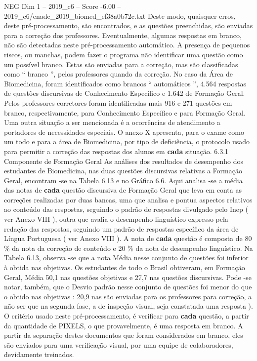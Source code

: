 \begin{textsample}{NEG Dim 1 – 2019\_c6 – Score -6.00 – 2019\_c6/enade\_2019\_biomed\_ef38a0b72c.txt}
Deste modo, quaisquer erros, deste pré-processamento, são encontrados, e as questões preenchidas, são enviadas para a correção dos professores.
Eventualmente, algumas respostas em branco, não são detectadas neste pré-processamento automático.
A presença de pequenos riscos, ou manchas, podem fazer o programa não identificar uma questão como um possível branco.
Estas são enviadas para a correção, mas são classificadas como “ branco ”, pelos professores quando da correção.
No caso da Área de Biomedicina, foram identificados como brancos “ automáticos ”, 4.564 respostas de questões discursivas de Conhecimento Específico e 1.642 de Formação Geral.
Pelos professores corretores foram identificadas mais 916 e 271 questões em branco, respectivamente, para Conhecimento Específico e para Formação Geral.
Uma outra situação a ser mencionada é a ocorrências de atendimento a portadores de necessidades especiais.
O anexo X apresenta, para o exame como um todo e para a área de Biomedicina, por tipo de deficiência, o protocolo usado para permitir a correção das respostas dos alunos em \textbf{cada} situação. 6.3.1 Componente de Formação Geral As análises dos resultados de desempenho dos estudantes de Biomedicina, nas duas questões discursivas relativas a Formação Geral, encontram -se na Tabela 6.13 e no Gráfico 6.6.
Aqui analisa -se a média das notas de \textbf{cada} questão discursiva de Formação Geral que leva em conta as correções realizadas por duas bancas, uma que analisa e pontua aspectos relativos ao conteúdo das respostas, seguindo o padrão de respostas divulgado pelo Inep ( ver Anexo VIII ), outra que avalia o desempenho linguístico expresso pela redação das respostas, seguindo um padrão de respostas específico da área de Língua Portuguesa ( ver Anexo VIII ).
A nota de \textbf{cada} questão é composta de 80 \% da nota da correção de conteúdo e 20 \% da nota de desempenho linguístico.
Na Tabela 6.13, observa -se que a nota Média nesse conjunto de questões foi inferior à obtida nas objetivas.
Os estudantes de todo o Brasil obtiveram, em Formação Geral, Média 50,1 nas questões objetivas e 27,7 nas questões discursivas.
Pode -se notar, também, que o Desvio padrão nesse conjunto de questões foi menor do que o obtido nas objetivas : 20,9 nas são enviadas para os professores para correção, a não ser que na segunda fase, a de inspeção visual, seja constatada uma resposta ).
O critério usado neste pré-processamento, é verificar para \textbf{cada} questão, a partir da quantidade de PIXELS, o que provavelmente, é uma resposta em branco.
A partir da separação destes documentos que foram considerados em branco, eles são enviados para uma verificação visual, por uma equipe de colaboradores, devidamente treinados.

\end{textsample}
